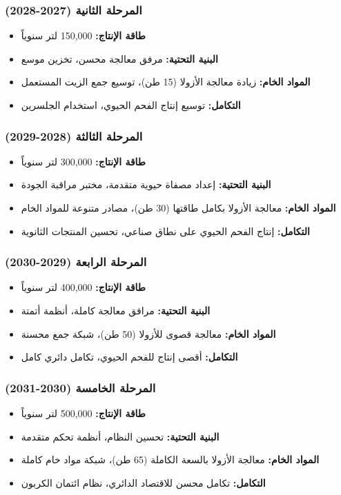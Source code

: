 \subsubsection{المرحلة الثانية (2027-2028)}
\begin{itemize}
    \item \textbf{طاقة الإنتاج:} 150,000 لتر سنوياً
    \item \textbf{البنية التحتية:} مرفق معالجة محسن، تخزين موسع
    \item \textbf{المواد الخام:} زيادة معالجة الأزولا (15 طن)، توسيع جمع الزيت المستعمل
    \item \textbf{التكامل:} توسيع إنتاج الفحم الحيوي، استخدام الجلسرين
\end{itemize}

\subsubsection{المرحلة الثالثة (2028-2029)}
\begin{itemize}
    \item \textbf{طاقة الإنتاج:} 300,000 لتر سنوياً
    \item \textbf{البنية التحتية:} إعداد مصفاة حيوية متقدمة، مختبر مراقبة الجودة
    \item \textbf{المواد الخام:} معالجة الأزولا بكامل طاقتها (30 طن)، مصادر متنوعة للمواد الخام
    \item \textbf{التكامل:} إنتاج الفحم الحيوي على نطاق صناعي، تحسين المنتجات الثانوية
\end{itemize}

\subsubsection{المرحلة الرابعة (2029-2030)}
\begin{itemize}
    \item \textbf{طاقة الإنتاج:} 400,000 لتر سنوياً
    \item \textbf{البنية التحتية:} مرافق معالجة كاملة، أنظمة أتمتة
    \item \textbf{المواد الخام:} معالجة قصوى للأزولا (50 طن)، شبكة جمع محسنة
    \item \textbf{التكامل:} أقصى إنتاج للفحم الحيوي، تكامل دائري كامل
\end{itemize}

\subsubsection{المرحلة الخامسة (2030-2031)}
\begin{itemize}
    \item \textbf{طاقة الإنتاج:} 500,000 لتر سنوياً
    \item \textbf{البنية التحتية:} تحسين النظام، أنظمة تحكم متقدمة
    \item \textbf{المواد الخام:} معالجة الأزولا بالسعة الكاملة (65 طن)، شبكة مواد خام كاملة
    \item \textbf{التكامل:} تكامل محسن للاقتصاد الدائري، نظام ائتمان الكربون
\end{itemize}


